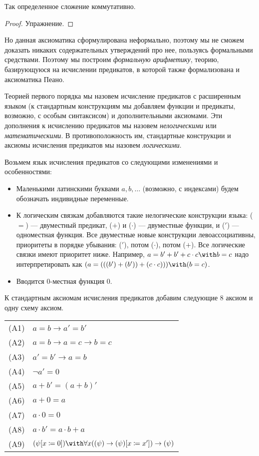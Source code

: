 \begin{theorem}Так определенное сложение коммутативно.
\end{theorem}
\begin{proof}Упражнение.\end{proof}

Но данная аксиоматика сформулирована неформально, поэтому мы не сможем
доказать никаких содержательных утверждений про нее, пользуясь формальными
средствами. Поэтому мы построим \emph{формальную арифметику}, теорию,
базирующуюся на исчислении предикатов, в которой также формализована и
аксиоматика Пеано.

\begin{definition}Теорией первого порядка мы назовем исчисление предикатов
с расширенным языком (к стандартным конструкциям мы добавляем функции и 
предикаты, возможно, с особым синтаксисом) и дополнительными аксиомами. 
Эти дополнения к исчислению предикатов мы назовем \emph{нелогическими} или 
\emph{математическими}. В противоположность им, стандартные конструкции и 
аксиомы исчисления предикатов мы назовем \emph{логическими}.
\end{definition}

Возьмем язык исчисления предикатов со следующими изменениями и особенностями:

\begin{itemize}
\item Маленькими латинскими буквами $a,b,\dots$ (возможно, с индексами) будем 
обозначать индивидные переменные. 
\item К логическим связкам добавляются такие нелогические конструкции языка: 
($=$) --- двуместный предикат, ($+$) и ($\cdot$) --- двуместные функции, и 
($'$) --- одноместная функция. Все двуместные новые конструкции левоассоциативны, 
приоритеты в порядке убывания: ($'$), потом ($\cdot$), потом ($+$). 
Все логические связки имеют приоритет ниже. Например, $a= b'+b'+c \cdot c \with b = c$ 
надо интерпретировать как $(a = (((b') + (b')) + (c \cdot c))) \with (b = c)$.
\item Вводится 0-местная функция $0$.
\end{itemize}

К стандартным аксиомам исчисления предикатов добавим следующие 8 аксиом и одну схему аксиом.

\begin{tabular}{ll}
(A1) & $a = b \rightarrow a' = b'$\\
(A2) & $a = b \rightarrow a = c \rightarrow b = c$\\
(A3) & $a' = b' \rightarrow a = b$\\
(A4) & $\neg a' = 0$\\
(A5) & $a + b' = (a+b)'$\\
(A6) & $a + 0 = a$\\
(A7) & $a \cdot 0 = 0$\\
(A8) & $a \cdot b' = a \cdot b + a$\\
(A9) & $(\psi [x \coloneqq  0]) \with \forall{x}((\psi) \rightarrow (\psi) [x \coloneqq  x']) \rightarrow (\psi)$
\end{tabular}


